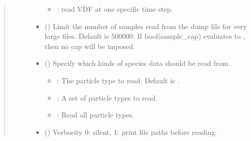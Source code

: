 \documentclass[letterpaper,10pt,english,openany,oneside]{sphinxmanual}
\begin{document}
\begin{fulllineitems}
\begin{fulllineitems}
\begin{quote}
\begin{description}
\begin{itemize}
\begin{itemize}
\item {} 
\sphinxAtStartPar
{}: read VDF at one specific time step.

\end{itemize}


\item {} 
\sphinxAtStartPar
{} () \textendash{} Limit the number of samples read from the dump
file for very large files. Default is 500000. If bool(sample\_cap)
evaluates to , then no cap will be imposed.

\item {} 
\sphinxAtStartPar
{} (\sphinxstyleliteralemphasis{\sphinxupquote{, }}\sphinxstyleliteralemphasis{\sphinxupquote{{[}}}\sphinxstyleliteralemphasis{\sphinxupquote{{]}}}) \textendash{} 
\sphinxAtStartPar
Specify which kinds of species data
should be read from.
\begin{itemize}
\item {} 
\sphinxAtStartPar
{}: The particle type to read. Default is .

\item {} 
\sphinxAtStartPar
{}: A set of particle types to read.

\item {} 
\sphinxAtStartPar
{}: Read all particle types.

\end{itemize}


\item {} 
\sphinxAtStartPar
{} () \textendash{} Verbosity \textendash{} 0: silent, 1: print file paths before reading.


\end{itemize}
\end{description}
\end{quote}
\end{fulllineitems}
\end{fulllineitems}
\end{document}
